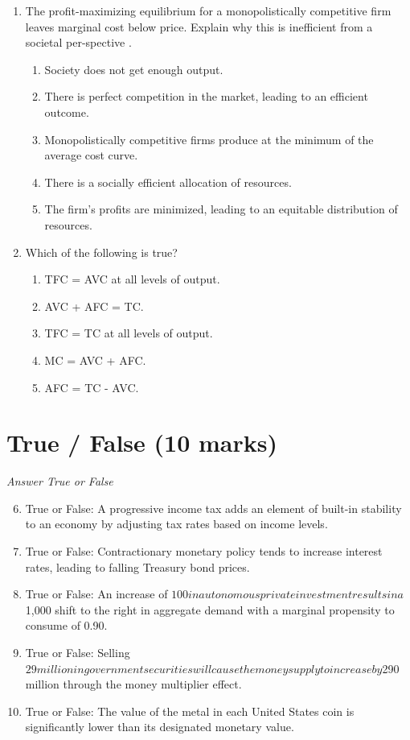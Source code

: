 \documentclass[12pt]{article}
\begin{document}
\begin{enumerate}[label=\arabic*.]
\begin{enumerate}[label=(\alph*)]
    \item When the debt is negative the deficit decreases.
\end{enumerate}
\item The profit-maximizing equilibrium for a monopolistically competitive firm leaves marginal cost below price. Explain why this is inefficient from a societal per-spective .
\begin{enumerate}[label=(\alph*)]
    \item Society does not get enough output.
    \item There is perfect competition in the market, leading to an efficient outcome.
    \item Monopolistically competitive firms produce at the minimum of the average cost curve.
    \item There is a socially efficient allocation of resources.
    \item The firm's profits are minimized, leading to an equitable distribution of resources.
\end{enumerate}
\item Which of the following is true?
\begin{enumerate}[label=(\alph*)]
    \item TFC = AVC at all levels of output.
    \item AVC + AFC = TC.
    \item TFC = TC at all levels of output.
    \item MC = AVC + AFC.
    \item AFC = TC - AVC.
\end{enumerate}
\end{enumerate}

\section*{True / False (10 marks)}
\textit{Answer True or False}
\begin{enumerate}[label=\arabic*.]
\setcounter{enumi}{5}
\item True or False: A progressive income tax adds an element of built-in stability to an economy by adjusting tax rates based on income levels.
\item True or False: Contractionary monetary policy tends to increase interest rates, leading to falling Treasury bond prices.
\item True or False: An increase of $100 in autonomous private investment results in a $1,000 shift to the right in aggregate demand with a marginal propensity to consume of 0.90.
\item True or False: Selling $29 million in government securities will cause the money supply to increase by $290 million through the money multiplier effect.
\item True or False: The value of the metal in each United States coin is significantly lower than its designated monetary value.
\end{enumerate}
\end{document}
